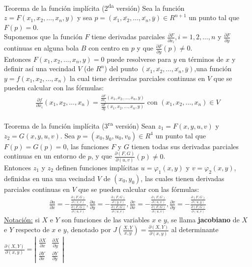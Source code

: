 \documentclass[a4paper, twoside]{article}
\numberwithin{equation}{section}
\numberwithin{figure}{section}
\numberwithin{table}{section}
\begin{document}
\begin{teorema*}{Teorema de la función implícita (2\textsuperscript{da} versión)}
	Sea la función $z=F(x_1,x_2,\ldots,x_n,y)$ y sea $p=(\overline{x_1},\overline{x_2},\ldots,\overline{x_n},\overline{y}) \in R^{n+1}$ un punto tal que $F\left(p\right)=0$.\\
	
	Suponemos que la función $F$ tiene derivadas parciales $\frac{\partial F}{\partial x_i},i=1,2,\ldots,n$ y $\frac{\partial F}{\partial y}$ continuas en alguna bola $B$ con centro en $p$ y que $\frac{\partial F}{\partial y}(p)\ne0$.\\
	
	Entonces $F(x_1,x_2,\ldots,x_n,y)=0$ puede resolverse para $y$ en términos de $x$ y definir así una vecindad $V$ (de $R^n$) del punto $(\overline{x_1},\overline{x_2},\ldots,\overline{x_n},\overline{y})$,una función $y=f(x_1,x_2,\ldots,x_n)$ la cual tiene derivadas parciales continuas en $V$ que se pueden calcular con las fórmulas:
	\begin{align}
		\frac{\partial f}{\partial x_i}(x_1,x_2,\ldots,x_n)=\frac{\frac{\partial F}{\partial x_i}(x_1,x_2,\ldots,x_n,y)}{\frac{\partial F}{\partial y}(x_1,x_2,\ldots,x_n,y)} \text{ con } (x_1,x_2,\ldots,x_n) \in V
	\end{align}
\end{teorema*}

\begin{teorema*}{Teorema de la función implícita (3\textsuperscript{ra} versión)}
	Sean $z_1=F(x,y,u,v)$ y $z_2=G(x,y,u,v)$. Sea $p=(x_0,y_0,u_0,v_0) \in R^4$ un punto tal que $F(p)=G(p)=0$, las funciones $F$ y $G$ tienen todas sus derivadas parciales continuas en un entorno de $p$, y que $\frac{\partial(F,G)}{\partial(u,v)}(p)\ne0$.\\
			
	Entonces $z_1$ y $z_2$ definen funciones implícitas $u=\varphi_1(x,y)$ y $v=\varphi_2(x,y)$, definidas en una una vecindad $V$ de $(x_0,y_0)$, las cuales tienen derivadas parciales continuas en $V$ que se pueden calcular con las fórmulas:
	\begin{align}
		\frac{\partial u}{\partial x}=-\frac{\frac{\partial(F,G)}{\partial(x,v)}}{\frac{\partial(F,G)}{\partial(u,v)}},\frac{\partial u}{\partial y}=-\frac{\frac{\partial(F,G)}{\partial(y,v)}}{\frac{\partial(F,G)}{\partial(u,v)}},\frac{\partial v}{\partial x}=-\frac{\frac{\partial(F,G)}{\partial(u,x)}}{\frac{\partial(F,G)}{\partial(u,v)}},\frac{\partial v}{\partial y}=-\frac{\frac{\partial(F,G)}{\partial(u,y)}}{\frac{\partial(F,G)}{\partial(u,v)}}
	\end{align}
	\underline{Notación:} si $X$ e $Y$ son funciones de las variables $x$ e $y$, se llama \textbf{jacobiano} de $X$ e $Y$ respecto de $x$ e $y$, denotado por $J\left(\frac{X,Y}{x,y}\right)=\frac{\partial\left(X,Y\right)}{\partial\left(x,y\right)}$ al determinante $\frac{\partial\left(X,Y\right)}{\partial\left(x,y\right)}=\left|\begin{array}{cc}\frac{\partial X}{\partial x} & \frac{\partial X}{\partial y}\\
	\frac{\partial Y}{\partial x} & \frac{\partial Y}{\partial y}\end{array}\right|$
\end{teorema*}
\end{document}

